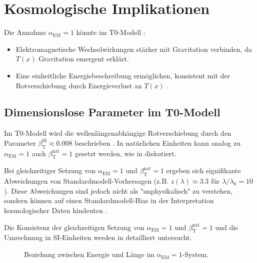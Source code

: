 \documentclass{article}
\newcommand{\Tfield}{T(x)}
\newcommand{\alphaEM}{\alpha_{\text{EM}}}
\newcommand{\betaT}{\beta_{\text{T}}}
\begin{document}
	\section{Kosmologische Implikationen}
	Die Annahme \(\alphaEM = 1\) könnte im T0-Modell \cite{pascher_galaxies_2025}:
	\begin{itemize}
		\item Elektromagnetische Wechselwirkungen stärker mit Gravitation verbinden, da \(\Tfield\) Gravitation emergent erklärt.
		\item Eine einheitliche Energiebeschreibung ermöglichen, konsistent mit der Rotverschiebung durch Energieverlust an \(\Tfield\) \cite{pascher_messdifferenzen_2025}.
	\end{itemize}
	
	\subsection{Dimensionslose Parameter im T0-Modell}
	Im T0-Modell wird die wellenlängenabhängige Rotverschiebung durch den Parameter \(\betaT^{\text{SI}} \approx 0.008\) beschrieben \cite{pascher_params_2025}. In natürlichen Einheiten kann analog zu \(\alphaEM = 1\) auch \(\betaT^{\text{nat}} = 1\) gesetzt werden, wie in \cite{pascher_beta_2025} diskutiert.
	
	Bei gleichzeitiger Setzung von \(\alphaEM = 1\) und \(\betaT^{\text{nat}} = 1\) ergeben sich signifikante Abweichungen von Standardmodell-Vorhersagen (z.B. \(z(\lambda) \approx 3.3\) für \(\lambda/\lambda_0 = 10\)). Diese Abweichungen sind jedoch nicht als "unphysikalisch" zu verstehen, sondern können auf einen Standardmodell-Bias in der Interpretation kosmologischer Daten hindeuten \cite{pascher_alphabeta_2025}.
	
	Die Konsistenz der gleichzeitigen Setzung von \(\alphaEM = 1\) und \(\betaT^{\text{nat}} = 1\) und die Umrechnung in SI-Einheiten werden in \cite{pascher_alphabeta_2025} detailliert untersucht.
	
	\begin{figure}[h]
		\centering
		\caption{Beziehung zwischen Energie und Länge im \(\alphaEM = 1\)-System.}
	\end{figure}
	
\end{document}
